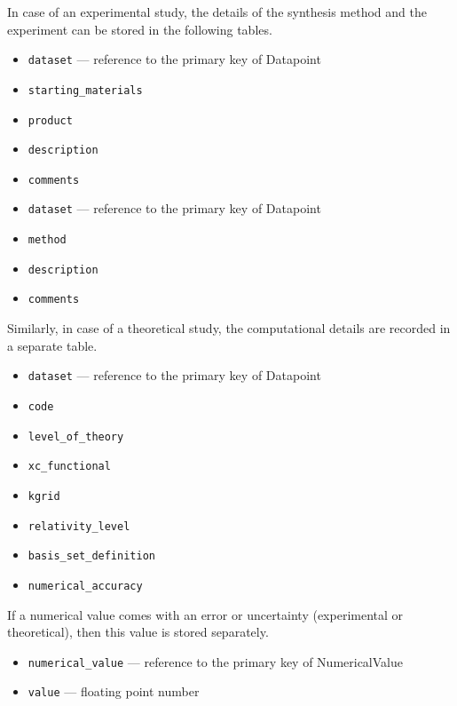 \documentclass{article}
\begin{document}
In case of an experimental study, the details of the synthesis method and the experiment can be stored in the following tables.
\begin{tcolorbox}[colback=green!5,colframe=green!40!black,title=SynthesisMethod(Base)]
  \begin{itemize}
  \item \texttt{dataset} --- reference to the primary key of Datapoint
  \item \texttt{starting\_materials}
  \item \texttt{product}
  \item \texttt{description}
  \item \texttt{comments}
  \end{itemize}
\end{tcolorbox}

\begin{tcolorbox}[colback=green!5,colframe=green!40!black,title=ExperimentalDetails(Base)]
  \begin{itemize}
  \item \texttt{dataset} --- reference to the primary key of Datapoint
  \item \texttt{method}
  \item \texttt{description}
  \item \texttt{comments}
  \end{itemize}
\end{tcolorbox}

Similarly, in case of a theoretical study, the computational details are recorded in a separate table.
\begin{tcolorbox}[colback=green!5,colframe=green!40!black,title=ComputationalDetails(Base)]
  \begin{itemize}
  \item \texttt{dataset} --- reference to the primary key of Datapoint
  \item \texttt{code}
  \item \texttt{level\_of\_theory}
  \item \texttt{xc\_functional}
  \item \texttt{kgrid}
  \item \texttt{relativity\_level}
  \item \texttt{basis\_set\_definition}
  \item \texttt{numerical\_accuracy}
  \end{itemize}
\end{tcolorbox}

If a numerical value comes with an error or uncertainty (experimental or theoretical), then this value is stored separately.
\begin{tcolorbox}[colback=green!5,colframe=green!40!black,title=Error(Base)]
  \begin{itemize}
  \item \texttt{numerical\_value} --- reference to the primary key of NumericalValue
  \item \texttt{value} --- floating point number
  \end{itemize}
\end{tcolorbox}
\end{document}
